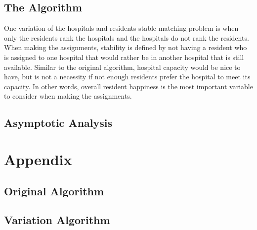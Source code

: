 \documentclass[letterpaper, 10pt,DIV=13]{scrartcl}
\numberwithin{equation}{section} %
\numberwithin{figure}{section} %
\numberwithin{table}{section} %
\begin{document}
\subsection{The Algorithm}
One variation of the hospitals and residents stable matching problem is when only the residents rank the hospitals and the hospitals do not rank the residents. When making the assignments, stability is defined by not having a resident who is assigned to one hospital that would rather be in another hospital that is still available. Similar to the original algorithm, hospital capacity would be nice to have, but is not a necessity if not enough residents prefer the hospital to meet its capacity. In other words, overall resident happiness is the most important variable to consider when making the assignments.

\subsection{Asymptotic Analysis}

\section{Appendix}
\lstset{numbers=left, numberstyle=\tiny, stepnumber=1, numbersep=5pt}


\subsection{Original Algorithm}


\subsection{Variation Algorithm}

\end{document}
